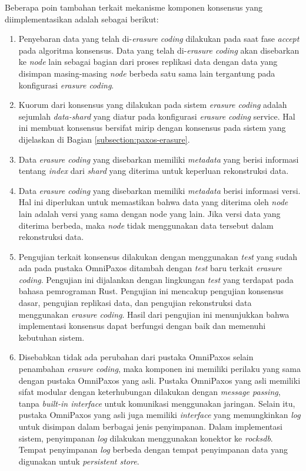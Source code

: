 Beberapa poin tambahan terkait mekanisme komponen konsensus yang diimplementasikan adalah sebagai berikut:
\begin{enumerate}
	\item Penyebaran data yang telah di-\textit{erasure coding} dilakukan pada saat fase \textit{accept} pada algoritma konsensus. Data yang telah di-\textit{erasure coding} akan disebarkan ke \textit{node} lain sebagai bagian dari proses replikasi data dengan data yang disimpan masing-masing \textit{node} berbeda satu sama lain tergantung pada konfigurasi \textit{erasure coding}.
	\item Kuorum dari konsensus yang dilakukan pada sistem \textit{erasure coding} adalah sejumlah \textit{data-shard} yang diatur pada konfigurasi \textit{erasure coding} service. Hal ini membuat konsensus bersifat mirip dengan konsensus pada sistem yang dijelaskan di Bagian \ref{subsection:paxos-erasure}.
	\item Data \textit{erasure coding} yang disebarkan memiliki \textit{metadata} yang berisi informasi tentang \textit{index} dari \textit{shard} yang diterima untuk keperluan rekonstruksi data.
	\item Data \textit{erasure coding} yang disebarkan memiliki \textit{metadata} berisi informasi versi. Hal ini diperlukan untuk memastikan bahwa data yang diterima oleh \textit{node} lain adalah versi yang sama dengan node yang lain. Jika versi data yang diterima berbeda, maka \textit{node} tidak menggunakan data tersebut dalam rekonstruksi data.
	\item Pengujian terkait konsensus dilakukan dengan menggunakan \textit{test} yang sudah ada pada pustaka OmniPaxos ditambah dengan \textit{test} baru terkait \textit{erasure coding}. Pengujian ini dijalankan dengan lingkungan \textit{test} yang terdapat pada bahasa pemrograman Rust. Pengujian ini mencakup pengujian konsensus dasar, pengujian replikasi data, dan pengujian rekonstruksi data menggunakan \textit{erasure coding}. Hasil dari pengujian ini menunjukkan bahwa implementasi konsensus dapat berfungsi dengan baik dan memenuhi kebutuhan sistem.
	\item Disebabkan tidak ada perubahan dari pustaka OmniPaxos selain penambahan \textit{erasure coding}, maka komponen ini memiliki perilaku yang sama dengan pustaka OmniPaxos yang asli. Pustaka OmniPaxos yang asli memiliki sifat modular dengan keterhubungan dilakukan dengan \textit{message passing}, tanpa \textit{built-in interface} untuk komunikasi menggunakan jaringan. Selain itu, pustaka OmniPaxos yang asli juga memiliki \textit{interface} yang memungkinkan \textit{log} untuk disimpan dalam berbagai jenis penyimpanan. Dalam implementasi sistem, penyimpanan \textit{log} dilakukan menggunakan konektor ke \textit{rocksdb}. Tempat penyimpanan \textit{log} berbeda dengan tempat penyimpanan data yang digunakan untuk \textit{persistent store}.
\end{enumerate}

